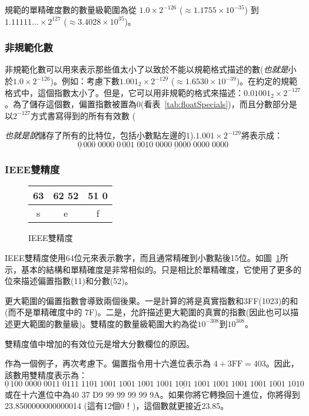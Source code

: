 規範的單精確度數的數量級範圍為從
$1.0 \times 2^{-126}$ ($\approx 1.1755 \times 10^{-35}$) 到
$1.11111\ldots \times 2^{127}$ ($\approx 3.4028 \times 10^{35}$)。

\subsubsection{非規範化數}

非規範化數可以用來表示那些值太小了以致於不能以規範格式描述的數(\emph{也就是}小於$1.0 \times 2^{-126}$)。例如：考慮下數$1.001_2 \times 2^{-129}$
($\approx 1.6530 \times 10^{-39}$)。在約定的規範格式中，這個指數太小了。但是，它可以用非規範的格式來描述：$0.01001_2 \times 2^{-127}$。為了儲存這個數，偏置指數被置為0(看表~\ref{tab:floatSpecials})，而且分數部分是以$2^{-127}$方式書寫得到的所有有效數
({\emph{也就是說}儲存了所有的比特位，包括小數點左邊的1).$1.001 \times 2^{-129}$將表示成：
\[ \underline{0}\,000\;0000\;0
   \,\underline{001\;0010\;0000\;0000\;0000\;0000} \]


\subsubsection{IEEE雙精度}

\begin{figure}[t]
\centering
\begin{tabular}{|c|c|c|}
\multicolumn{1}{p{0.3cm}}{63} &
\multicolumn{1}{p{3cm}}{62 \hfill 52} &
\multicolumn{1}{p{7cm}}{51 \hfill 0} \\
\hline
s & e & f \\
\hline
\end{tabular}
\caption{IEEE雙精度\label{fig:IEEEdouble}}
\end{figure}

IEEE雙精度使用64位元來表示數字，而且通常精確到小數點後15位。如圖~\ref{fig:IEEEdouble}所示，基本的結構和單精確度是非常相似的。只是相比於單精確度，它使用了更多的位來描述偏置指數(11)和分數(52)。

更大範圍的偏置指數會導致兩個後果。一是計算的將是真實指數和3FF(1023)的和(而不是單精確度中的
7F)。二是，允許描述更大範圍的真實的指數(因此也可以描述更大範圍的數量級)。雙精度的數量級範圍大約為從$10^{-308}$到$10^{308}$。

雙精度值中增加的有效位元是增大分數欄位的原因。

作為一個例子，再次考慮下。偏置指令用十六進位表示為
$4 + \mathrm{3FF} = 403$。因此，該數用雙精度表示為：
\[ \underline{0}\,100\;0000\;0011\;\underline{0111\;1101\;1001\;1001\;1001\;
   1001\;1001\;1001\;1001\;1001\;1001\;1001\;1010} \]
或在十六進位中為40 37 D9 99 99 99 99 9A。如果你將它轉換回十進位，你將得到23.8500000000000014 (這有12個0！)，這個數就更接近23.85。

}
